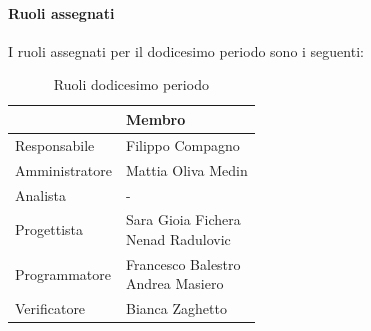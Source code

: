 \documentclass[a4paper,12pt]{article}
\begin{document}
            \paragraph{Ruoli assegnati}
            I ruoli assegnati per il dodicesimo periodo sono i seguenti:
                \begin{table}[H]
                \centering
                \caption{Ruoli dodicesimo periodo}
                \begin{tabular}{|l|l|}
                \hline
                    \rowcolor{lightgray}{\textbf{Ruolo}} & {\textbf{Membro}} \\
                \hline
                    Responsabile & Filippo Compagno  \\
                \hline
                    Amministratore & Mattia Oliva Medin  \\
                \hline
                    Analista & - \\
                \hline
                    Progettista & \makecell[l]{ Sara Gioia Fichera  \\ Nenad Radulovic }  \\
                \hline
                    Programmatore & \makecell[l]{ Francesco Balestro  \\ Andrea Masiero } \\
                \hline
                    Verificatore & Bianca Zaghetto \\
                \hline
                \end{tabular}
                \end{table}
                
\end{document}
